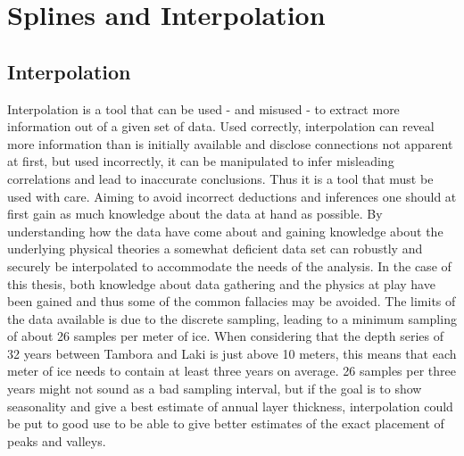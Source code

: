 \documentclass[../../CompleteThesis/Complete_1stDraft.tex]{subfiles}
\begin{document}
\section[Splines and Interpolation]{Splines and Interpolation}	
\label{Sec:CompMeths_SplinesAndInterpolation}
\subsection[Interpolation][Interpolation]{Interpolation}
\label{Subsec:CompMeths_SplinesAndInterpolation_Interpolation}
Interpolation is a tool that can be used - and misused - to extract more information out of a given set of data. Used correctly, interpolation can reveal more information than is initially available and disclose connections not apparent at first, but used incorrectly, it can be manipulated to infer misleading correlations and lead to inaccurate conclusions. Thus it is a tool that must be used with care. Aiming to avoid incorrect deductions and inferences one should at first gain as much knowledge about the data at hand as possible. By understanding how the data have come about and gaining knowledge about the underlying physical theories a somewhat deficient data set can robustly and securely be interpolated to accommodate the needs of the analysis. In the case of this thesis, both knowledge about data gathering and the physics at play have been gained and thus some of the common fallacies may be avoided. The limits of the data available is due to the discrete sampling, leading to a minimum sampling of about 26 samples per meter of ice.
When considering that the depth series of 32 years between Tambora and Laki is just above 10 meters, this means that each meter of ice needs to contain at least three years on average. 26 samples per three years might not sound as a bad sampling interval, but if the goal is to show seasonality and give a best estimate of annual layer thickness, interpolation could be put to good use to be able to give better estimates of the exact placement of peaks and valleys.\\
\end{document}
